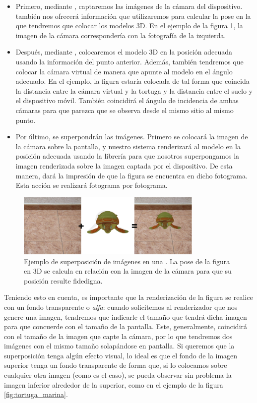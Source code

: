 \documentclass{subfiles}
\begin{document}
        \begin{itemize}
            \item Primero, mediante \webxr, captaremos las imágenes de la cámara del dispositivo. \webxr también nos ofrecerá información que utilizaremos para calcular la pose en la que tendremos que colocar los modelos 3D. En el ejemplo de la figura \ref{fig:sample_ra_schema}, la imagen de la cámara correspondería con la fotografía de la izquierda.
            \item Después, mediante \threejs, colocaremos el modelo 3D en la posición adecuada usando la información del punto anterior. Además, también tendremos que colocar la cámara virtual de manera que apunte al modelo en el ángulo adecuado. En el ejemplo, la figura estaría colocada de tal forma que coincida la distancia entre la cámara virtual y la tortuga y la distancia entre el suelo y el dispositivo móvil. También coincidirá el ángulo de incidencia de ambas cámaras para que parezca que se observa desde el mismo sitio al mismo punto.
            \item Por último, se superpondrán las imágenes. Primero se colocará la imagen de la cámara sobre la pantalla, y nuestro sistema renderizará al modelo en la posición adecuada usando la librería \threejs para que nosotros superpongamos la imagen renderizada sobre la imagen captada por el dispositivo. De esta manera, dará la impresión de que la figura se encuentra en dicho fotograma. Esta acción se realizará fotograma por fotograma.
        \end{itemize}

        \begin{figure}
        \centering
        \includegraphics[width=0.8\textwidth]{img/sample_ra_schema.png}
        \caption{Ejemplo de superposición de imágenes en una \ra. La pose de la figura en 3D se calcula en relación con la imagen de la cámara para que su posición resulte fidedigna.}
        \label{fig:sample_ra_schema}
        \end{figure}

        Teniendo esto en cuenta, es importante que la renderización de la figura se realice con un fondo transparente o \textit{alfa}: cuando solicitemos al renderizador que nos genere una imagen, tendremos que indicarle el tamaño que tendrá dicha imagen para que concuerde con el tamaño de la pantalla. Este, generalmente, coincidirá con el tamaño de la imagen que capte la cámara, por lo que tendremos dos imágenes con el mismo tamaño solapándose en pantalla. Si queremos que la superposición tenga algún efecto visual, lo ideal es que el fondo de la imagen superior tenga un fondo transparente de forma que, si lo colocamos sobre cualquier otra imagen (como es el caso), se pueda observar sin problema la imagen inferior alrededor de la superior, como en el ejemplo de la figura \ref{fig:tortuga_marina}.
        
\end{document}
